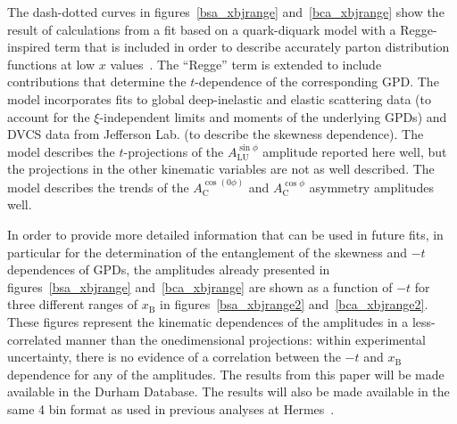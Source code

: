 The dash-dotted curves in figures~\ref{bsa_xbjrange} and~\ref{bca_xbjrange} show the result of calculations from a fit based on a quark-diquark model with a Regge-inspired term that is included in order to describe accurately parton distribution functions at low $x$ values~\cite{Liu11}. The ``Regge'' term is extended to include contributions that determine the $t$-dependence of the corresponding GPD. The model incorporates fits to global deep-inelastic and elastic scattering data (to account for the $\xi$-independent limits and moments of the underlying GPDs) and DVCS data from Jefferson Lab. (to describe the skewness dependence). The model describes the $t$-projections of the $A^{\sin\phi}_{\textrm{LU}}$ amplitude reported here well, but the projections in the other kinematic variables are not as well described. The model describes the trends of the $A_{\textrm{C}}^{\cos(0\phi)}$ and $A_{\textrm{C}}^{\cos\phi}$ asymmetry amplitudes well.

In order to provide more detailed information that can be used in future fits, in particular for the determination of the entanglement of the skewness and $-t$ dependences of GPDs, the amplitudes already presented in figures~\ref{bsa_xbjrange} and~\ref{bca_xbjrange} are shown as a function of $-t$ for three different ranges of $x_{\textrm{B}}$ in figures~\ref{bsa_xbjrange2} and~\ref{bca_xbjrange2}. These figures represent the kinematic dependences of the amplitudes in a less-correlated manner than the one\red{-}dimensional projections: within experimental uncertainty, there is no evidence of a correlation between the $-t$ and $x_{\textrm{B}}$ dependence for any of the amplitudes. The results from this paper will be made available in the Durham Database. The results will also be made available in the same 4 bin format as used in previous analyses at H{\sc ermes}~\cite{Air08,Air09,Air10b}.
